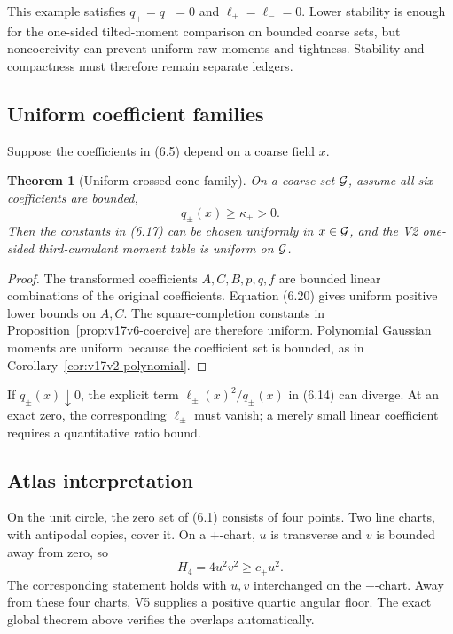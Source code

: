 \documentclass[11pt]{article}
\newtheorem{theorem}{Theorem}[section]
\theoremstyle{remark}
\begin{document}
This example satisfies \(q_+=q_-=0\) and
\(\ell_+=\ell_-=0\).  Lower stability is enough for the one-sided
tilted-moment comparison on bounded coarse sets, but noncoercivity
can prevent uniform raw moments and tightness.  Stability and
compactness must therefore remain separate ledgers.

\subsection{Uniform coefficient families}

Suppose the coefficients in (6.5) depend on a coarse field \(x\).

\begin{theorem}[Uniform crossed-cone family]
\label{thm:v17v6-family}
On a coarse set \({\cal G}\), assume all six coefficients are
bounded,
\[
 q_\pm(x)\geq\kappa_\pm>0.                          \tag{6.20}
\]
Then the constants in (6.17) can be chosen uniformly in
\(x\in{\cal G}\), and the V2 one-sided third-cumulant moment table is
uniform on \({\cal G}\).
\end{theorem}

\begin{proof}
The transformed coefficients \(A,C,B,p,q,f\) are bounded linear
combinations of the original coefficients.  Equation (6.20) gives
uniform positive lower bounds on \(A,C\).  The square-completion
constants in Proposition~\ref{prop:v17v6-coercive} are therefore
uniform.  Polynomial Gaussian moments are uniform because the
coefficient set is bounded, as in
Corollary~\ref{cor:v17v2-polynomial}.
\end{proof}

If \(q_\pm(x)\downarrow0\), the explicit term
\(\ell_\pm(x)^2/q_\pm(x)\) in (6.14) can diverge.  At an exact zero,
the corresponding \(\ell_\pm\) must vanish; a merely small linear
coefficient requires a quantitative ratio bound.

\subsection{Atlas interpretation}

On the unit circle, the zero set of (6.1) consists of four points.
Two line charts, with antipodal copies, cover it.  On a \(+\)-chart,
\(u\) is transverse and \(v\) is bounded away from zero, so
\[
 H_4=4u^2v^2\geq c_+u^2.                            \tag{6.21}
\]
The corresponding statement holds with \(u,v\) interchanged on the
\(-\)-chart.  Away from these four charts, V5 supplies a positive
quartic angular floor.  The exact global theorem above verifies the
overlaps automatically.
\end{document}
